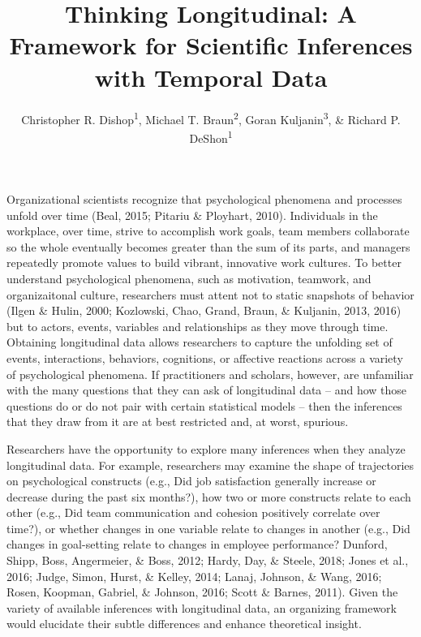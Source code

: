 \documentclass[english,,man]{apa6}
\title{Thinking Longitudinal: A Framework for Scientific Inferences with
Temporal Data}
\author{Christopher R. Dishop\textsuperscript{1}, Michael T.
Braun\textsuperscript{2}, Goran Kuljanin\textsuperscript{3}, \& Richard
P. DeShon\textsuperscript{1}}
\date{}
\affiliation{
\vspace{0.5cm}
\textsuperscript{1} Michigan State University\\\textsuperscript{2} University of South Florida\\\textsuperscript{3} DePaul University}
\theoremstyle{definition}
\theoremstyle{definition}
\theoremstyle{definition}
\theoremstyle{remark}
\begin{document}
\maketitle

Organizational scientists recognize that psychological phenomena and
processes unfold over time (Beal, 2015; Pitariu \& Ployhart, 2010).
Individuals in the workplace, over time, strive to accomplish work
goals, team members collaborate so the whole eventually becomes greater
than the sum of its parts, and managers repeatedly promote values to
build vibrant, innovative work cultures. To better understand
psychological phenomena, such as motivation, teamwork, and
organizaitonal culture, researchers must attent not to static snapshots
of behavior (Ilgen \& Hulin, 2000; Kozlowski, Chao, Grand, Braun, \&
Kuljanin, 2013, 2016) but to actors, events, variables and relationships
as they move through time. Obtaining longitudinal data allows
researchers to capture the unfolding set of events, interactions,
behaviors, cognitions, or affective reactions across a variety of
psychological phenomena. If practitioners and scholars, however, are
unfamiliar with the many questions that they can ask of longitudinal
data -- and how those questions do or do not pair with certain
statistical models -- then the inferences that they draw from it are at
best restricted and, at worst, spurious.

Researchers have the opportunity to explore many inferences when they
analyze longitudinal data. For example, researchers may examine the
shape of trajectories on psychological constructs (e.g., Did job
satisfaction generally increase or decrease during the past six
months?), how two or more constructs relate to each other (e.g., Did
team communication and cohesion positively correlate over time?), or
whether changes in one variable relate to changes in another (e.g., Did
changes in goal-setting relate to changes in employee performance?
Dunford, Shipp, Boss, Angermeier, \& Boss, 2012; Hardy, Day, \& Steele,
2018; Jones et al., 2016; Judge, Simon, Hurst, \& Kelley, 2014; Lanaj,
Johnson, \& Wang, 2016; Rosen, Koopman, Gabriel, \& Johnson, 2016; Scott
\& Barnes, 2011). Given the variety of available inferences with
longitudinal data, an organizing framework would elucidate their subtle
differences and enhance theoretical insight.
\end{document}
